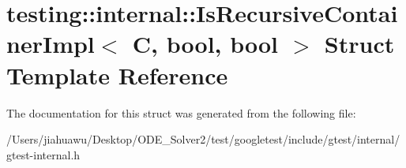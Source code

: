 \hypertarget{structtesting_1_1internal_1_1_is_recursive_container_impl}{}\section{testing\+:\+:internal\+:\+:Is\+Recursive\+Container\+Impl$<$ C, bool, bool $>$ Struct Template Reference}
\label{structtesting_1_1internal_1_1_is_recursive_container_impl}


The documentation for this struct was generated from the following file\+:\begin{DoxyCompactItemize}
\item 
/\+Users/jiahuawu/\+Desktop/\+O\+D\+E\+\_\+\+Solver2/test/googletest/include/gtest/internal/gtest-\/internal.\+h\end{DoxyCompactItemize}
